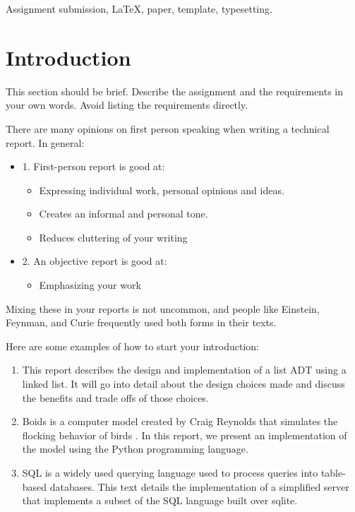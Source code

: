 \documentclass[conference]{IEEEtran}
\begin{document}
\begin{IEEEkeywords}
	Assignment submission, \LaTeX, paper, template, typesetting.
\end{IEEEkeywords}

\section{Introduction}
\label{Section:Introduction}
This section should be brief. Describe the assignment and the requirements in your own words. Avoid listing the requirements directly.

\bigskip

There are many opinions on first person speaking when writing a technical report. In general:

\begin{itemize}
	\item 1. First-person report is good at:
	      \begin{itemize}
		      \item Expressing individual work, personal opinions and ideas.
		      \item Creates an informal and personal tone.
		      \item Reduces cluttering of your writing
	      \end{itemize}
	\item 2. An objective report is good at:
	      \begin{itemize}
		      \item Emphasizing your work
	      \end{itemize}
\end{itemize}


Mixing these in your reports is not uncommon, and people like Einstein, Feynman, and Curie frequently used both forms in their texts.

\bigskip

Here are some examples of how to start your introduction:

\begin{enumerate}
	\item This report describes the design and implementation of a list ADT using a linked list. It will go into detail about the design choices made and discuss the benefits and trade offs of those choices.
	\item Boids is a computer model created by Craig Reynolds that simulates the flocking behavior of birds \cite{TanenbaumAndrewS.2024Mos}. In this report, we present an implementation of the model using the Python programming language.
	\item SQL is a widely used querying language used to process queries into table-based databases. This text details the implementation of a simplified server that implements a subset of the SQL language built over sqlite.
\end{enumerate}
\end{document}
